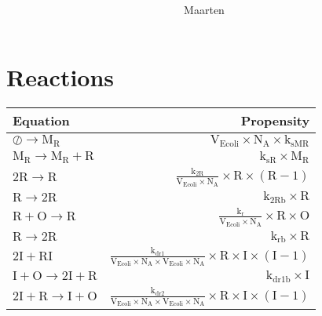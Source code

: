 \documentclass[11pt]{article}
\begin{document}
\title{
}
\author{
Maarten
}
\maketitle
\section{Reactions}
\begin{table}
    \centering
    \begin{tabular}{l|r}
    Equation & Propensity \\
    \hline
            $ \oslash \rightarrow \text{M}_{\text{R}} $
               &
            $ \text{V}_{\text{Ecoli}} \times \text{N}_{\text{A}} \times \text{k}_{\text{sMR}} $
        \\
            $ \text{M}_{\text{R}} \rightarrow \text{M}_{\text{R}} + \text{R} $
               &
            $ \text{k}_{\text{sR}} \times \text{M}_{\text{R}} $
        \\
            $ 2\text{R} \rightarrow \text{R} $
               &
            $ \frac{\text{k}_{\text{2R}}}{\text{V}_{\text{Ecoli}} \times \text{N}_{\text{A}}}\times \text{R} \times (\text{R}-1) $
        \\
            $ \text{R} \rightarrow 2\text{R} $
               &
            $ \text{k}_{\text{2Rb}} \times \text{R} $
        \\
            $ \text{R} + \text{O} \rightarrow \text{R} $
               &
            $ \frac{\text{k}_{\text{r}}}{\text{V}_{\text{Ecoli}} \times \text{N}_{\text{A}}}\times \text{R} \times \text{O} $
        \\
            $ \text{R} \rightarrow 2\text{R} $
               &
            $ \text{k}_{\text{rb}} \times \text{R} $
        \\
            $ 2\text{I} + \text{R} \text{I} $
               &
            $ \frac{\text{k}_{\text{dr1}}}{\text{V}_{\text{Ecoli}} \times \text{N}_{\text{A}} \times \text{V}_{\text{Ecoli}} \times \text{N}_{\text{A}}}\times \text{R} \times \text{I} \times (\text{I}-1) $
        \\
            $ \text{I} + \text{O} \rightarrow 2\text{I} + \text{R} $
               &
            $ \text{k}_{\text{dr1b}} \times \text{I} $
        \\
            $ 2\text{I} + \text{R} \rightarrow \text{I} + \text{O} $
               &
            $ \frac{\text{k}_{\text{dr2}}}{\text{V}_{\text{Ecoli}} \times \text{N}_{\text{A}} \times \text{V}_{\text{Ecoli}} \times \text{N}_{\text{A}}}\times \text{R} \times \text{I} \times (\text{I}-1) $

\end{tabular}
\end{table}
\end{document}
